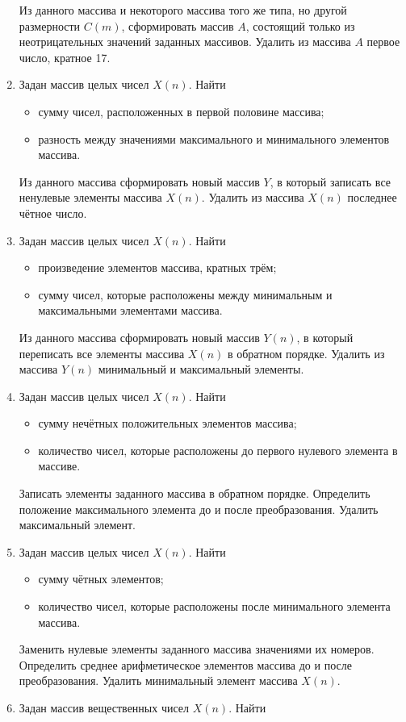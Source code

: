 \begin{enumerate}
Из данного массива и некоторого массива того же типа, но другой размерности $C(m)$,
сформировать массив $A$, состоящий только из неотрицательных значений заданных массивов. Удалить из
массива $A$ первое число, кратное 17.
\item Задан массив целых чисел $X(n)$. Найти
\begin{itemize}
\item сумму чисел, расположенных в первой половине массива;
\item разность между значениями максимального и минимального элементов массива.
\end{itemize}
Из данного массива сформировать новый массив $Y$, в который записать все ненулевые элементы
массива $X(n)$. Удалить из массива $X(n)$ последнее чётное число.
\item Задан массив целых чисел $X(n)$. Найти
\begin{itemize}
\item произведение элементов массива, кратных трём;
\item сумму чисел, которые расположены между минимальным и максимальными элементами массива.
\end{itemize}
Из данного массива сформировать новый массив $Y(n)$, в который переписать все элементы
массива $X(n)$ в обратном порядке. Удалить из массива $Y(n)$
минимальный и максимальный элементы.
\item Задан массив целых чисел $X(n)$. Найти
\begin{itemize}
\item сумму нечётных положительных элементов массива;
\item количество чисел, которые расположены до первого нулевого элемента в массиве.
\end{itemize}
Записать элементы заданного массива в обратном порядке. Определить положение максимального элемента до и после
преобразования. Удалить максимальный элемент.
\item Задан массив целых чисел $X(n)$. Найти
\begin{itemize}
\item сумму чётных элементов;
\item количество чисел, которые расположены после минимального элемента массива.
\end{itemize}
Заменить нулевые элементы заданного массива значениями их номеров. Определить среднее арифметическое элементов
массива до и после преобразования. Удалить минимальный элемент массива $X(n)$.
\item Задан массив вещественных чисел $X(n)$. Найти

\end{enumerate}
